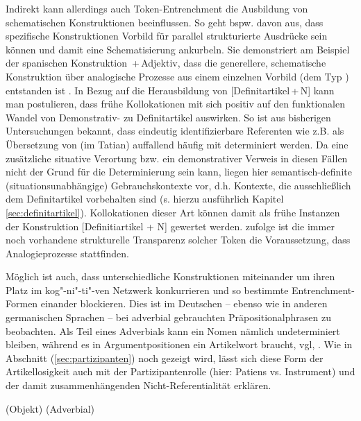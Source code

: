 Indirekt kann allerdings auch Token-Entrenchment die Ausbildung von schematischen Konstruktionen beeinflussen. So geht bspw. \textcite[96]{Bybee2010} davon aus, dass spezifische Konstruktionen Vorbild für parallel strukturierte Ausdrücke sein können und damit eine Schematisierung ankurbeln. Sie demonstriert am Beispiel der spanischen Konstruktion \,+\,Adjektiv, dass die generellere, schematische  Konstruktion über analogische Prozesse aus einem einzelnen Vorbild (dem Typ ) entstanden ist \parencite[72]{Bybee2010}. In Bezug auf die Herausbildung von [Definitartikel\,+\,N] kann man postulieren, dass frühe Kollokationen mit  sich positiv auf den funktionalen Wandel von Demonstrativ- zu Definitartikel auswirken. So ist aus bisherigen Untersuchungen \parencite{Oubouzar1992} bekannt, dass eindeutig identifizierbare Referenten wie  z.B.  als Übersetzung von  (im Tatian) auffallend häufig mit  determiniert werden. Da eine zusätzliche situative Verortung bzw. ein demonstrativer Verweis in diesen Fällen nicht der Grund für die Determinierung sein kann, liegen hier semantisch-definite (situationsunabhängige) Gebrauchskontexte vor, d.h. Kontexte, die ausschließlich dem Definitartikel vorbehalten sind (s. hierzu ausführlich Kapitel \ref{sec:definitartikel}). Kollokationen dieser Art können damit als frühe Instanzen der Konstruktion [Definitiartikel + N] gewertet werden. \textcite[96]{Bybee2010} zufolge ist die immer noch vorhandene strukturelle Transparenz solcher Token die Voraussetzung, dass Analogieprozesse stattfinden.   

Möglich ist auch, dass unterschiedliche Konstruktionen miteinander um ihren Platz im kog"-ni"-ti"-ven Netzwerk konkurrieren und so bestimmte Entrenchment-Formen einander blockieren. Dies ist im Deutschen -- ebenso wie in anderen germanischen Sprachen \parencite[s.][]{Himmelmann1998} -- bei adverbial gebrauchten Präpositionalphrasen zu beobachten. Als Teil eines Adverbials kann ein Nomen nämlich undeterminiert bleiben, während es in Argumentpositionen ein Artikelwort braucht, vgl, . Wie in Abschnitt (\ref{sec:partizipanten}) noch gezeigt wird, lässt sich diese Form der Artikellosigkeit auch mit der Partizipantenrolle (hier: Patiens vs. Instrument) und der damit zusammenhängenden Nicht-Referentialität erklären.  

\begin{exe}
	\ex \label{ex:fuss}
	\begin{xlist}
		\ex \label{ex:denfuss}  (Objekt)
		\ex \label{ex:zufuss}  (Adverbial)
	\end{xlist}
\end{exe}

